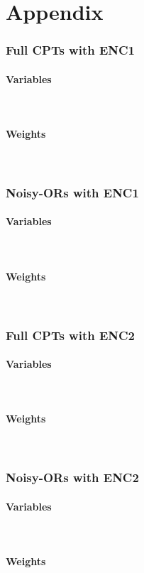 \documentclass{article}
\begin{document}



\newpage

\section*{Appendix}
\label{appendix}
\subsubsection*{Full CPTs with ENC1}
\paragraph{Variables}\mbox{}\\

\newpage
\paragraph{Weights}\mbox{}\\


\newpage

\subsubsection*{Noisy-ORs with ENC1}
\paragraph{Variables}\mbox{}\\

\newpage
\paragraph{Weights}\mbox{}\\


\newpage

\subsubsection*{Full CPTs with ENC2}
\paragraph{Variables}\mbox{}\\

\newpage
\paragraph{Weights}\mbox{}\\


\newpage

\subsubsection*{Noisy-ORs with ENC2}
\paragraph{Variables}\mbox{}\\

\newpage
\paragraph{Weights}\mbox{}\\

\end{document}
